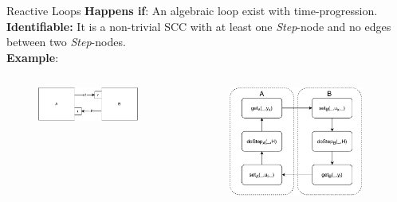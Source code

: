 \documentclass{beamer}
\begin{document}
\begin{frame}{Reactive Loops}
    \textbf{Happens if}: An algebraic loop exist with time-progression.\\
    \textbf{Identifiable:} It is a non-trivial SCC with at least one \textit{Step}-node and no edges between two \textit{Step}-nodes. \\
    \textbf{Example}: 
    \begin{columns}[T] %
        \begin{column}{.48\textwidth}
            \begin{figure}    
                \includegraphics[width=0.9\textwidth]{images/reactive_loop_scenario.pdf}
            \end{figure}
    \end{column}%
    \hfill%
    \begin{column}{.48\textwidth}
        \begin{figure}    
            \includegraphics[width=0.9\textwidth]{images/reactive_step_graph.pdf}
        \end{figure}
    \end{column}%
    \end{columns}
\end{frame}
\end{document}
